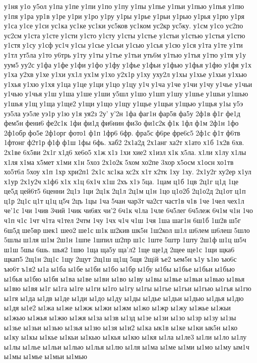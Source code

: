 {{у1ня
у1о
у5ол
у1па
у1пе
у1пи
у1по
у1пу
у1пы
у1пье
у1пьи
у1пью
у1пья
у1пю
у1пя
у1ра
ур1в
у1ре
у1ри
у1ро
у1ру
у1ры
у1рье
у1рьи
у1рью
у1рья
у1рю
у1ря
у1са
у1се
у1си
ус1ка
ус1ке
ус1ки
ус5ков
ус1ком
ус2кр
ус5ку.
у1см
у1со
ус2по
ус2см
у1ста
у1сте
у1сти
у1сто
у1сту
у1сты
у1стье
у1стьи
у1стью
у1стья
у1стю
у1стя
у1су
у1сф
ус1ч
у1сы
у1сье
у1сьи
у1сью
у1сья
у1сю
у1ся
у1та
у1те
у1ти
у1тл
ут5ла
у1то
у6трь
у1ту
у1ты
у1тье
у1тьи
уть6м
у1тью
у1тья
у1тю
у1тя
у1у
уум5
уу2с
у1фа
у1фе
у1фи
у1фо
у1фу
у1фье
у1фьи
у1фью
у1фья
у1фю
у1фя
у1х
у1ха
у2хв
у1хе
у1хи
ух1л
ух1м
у1хо
у2х1р
у1ху
уху2л
у1хы
у1хье
у1хьи
у1хью
у1хья
у1хю
у1хя
у1ца
у1це
у1ци
у1цо
у1цу
у1ч
у1ча
у1че
у1чи
у1чу
у1чье
у1чьи
у1чью
у1чья
у1ш
у1ша
у1ше
у1ши
у5шл
у1шо
у1шп
у1шу
у1шье
у1шьи
у1шью
у1шья
у1щ
у1ща
у1ще2
у1щи
у1що
у1щу
у1щье
у1щьи
у1щью
у1щья
у1ы
у5э
уэ5ла
уэ5ле
уэ1р
у1ю
у1я
уя2з
2у'
у'2н
1фа
фаг1н
фар5в
фа5у
2ф1в
ф1г
фе1д
фем5н
фени6
фе2с1к
1фи
фи1д
фи6нин
фи3о
фи1с2к
ф1к
1фл
ф1м
2ф1н
1фо
2ф1обр
фо5е
2ф1орг
фото1
ф1п
1фр6
6фр.
фра5с
ф6ре
фре6с5
2ф1с
ф1т
ф6тв
1фтонг
ф2т1р
ф1ф
ф1ш
1фы
6фь.
хаб2
2х1а2д
2х1анг
ха2т
х1ато
х1б
1х2в
6хв.
2х1ве
6х5ви
2х1г
х1д6
хе6о5
х1ж
х1з
1хи
хие2
х1изл
х1к
х5ла.
х1ли
х1лу
х1лы
х1ля
х1ма
х5мет
х1ми
х1н
5хоз
2х1о2к
5хом
хо2пе
3хор
х5осм
х1осн
хо1тв
хо5т6л
5хоу
х1п
1хр
хри2п1
2х1с
хс1ка
хс2х
х1т
х2тк
1ху
1ху.
2х1у2г
ху2ер
х1ул
х1ур
2х1у2ч
х1ф6
х1х
х1ц
6х1ч
х1ш
2хъ
х1э
5ца.
1цам
ц1б
1цв
2ц1г
ц1д
1це
це5д
цей6т5
6ценни
2ц1з
1ци
2ц1к
2ц1л
2ц1м
ц1н
1цо
ц1о2б
2ц1о2д
2ц1от
ц1п
ц1р
2ц1с
ц1т
ц1ц
ц5ч
2цъ
1цы
1ча
5чан
чар3т
ча2ст
част1в
ч1в
1че
1чел
чех1л
че'1с
1чи
1чив
3чий
1чик
чи6ях
чи'2
6ч1к
ч1ла
1чле
6ч5лег
6ч5леж
6ч1м
ч1н
1чо
ч1п
ч1с
1чт
ч1та
ч1тел
2чтм
1чу
1чх
ч1ч
ч1ш
1чя
1ша
шаг1н
6ш1б
1ш2в
ш5г
6ш5д
ше5вр
шек1
шео2
ше1с
ш1к
ш2кив
шк5н
1ш2кол
ш1л
ш6лем
ш6леш
5шло
5шлы
ш1ля
ш1м
2ш1н
1шпе
1шпил
ш2пр
ш1с
1ште
5штр
1шту
2ш1ф
ш1ц
ш5ч
ш1ш
5шы
6шь.
шья2
1шю
1ща
ща5у
ща'л2
1ще
ще1д
2щее
ще1с
1щи
щка6
щкап5
2щ1н
2щ1с
1щу
2щут
2щ1ш
щ1щ
5щя
2щiй
ъе2
ъем5н
ъ1у
ъ1ю
ъю6с
ъю6т
ъ1я2
ы1а
ы1ба
ы1бе
ы1би
ы1бо
ы1бр
ы1бу
ы1бы
ы1бье
ы1бьи
ы1бью
ы1бья
ы1бю
ы1бя
ы1ва
ы1ве
ы1ви
ы1во
ы1ву
ы1вы
ы1вье
ы1вьи
ы1вью
ы1вья
ы1вю
ы1вя
ы1г
ы1га
ы1ге
ы1ги
ы1го
ы1гу
ы1гы
ы1гье
ы1гьи
ы1гью
ы1гья
ы1гю
ы1гя
ы1да
ы1дв
ы1де
ы1ди
ы1до
ы1ду
ы1ды
ы1дье
ы1дьи
ы1дью
ы1дья
ы1дю
ы1дя
ы1е2
ы1жа
ы1же
ы1жж
ы1жи
ы1жм
ы1жо
ы1жр
ы1жу
ы1жье
ы1жьи
ы1жью
ы1жья
ы1жю
ы1жя
ы1за
ы1зв
ы1зд
ы1зе
ы1зи
ы1зо
ы1зр
ы1зу
ы1зы
ы1зье
ы1зьи
ы1зью
ы1зья
ы1зю
ы1зя
ы1и2
ы1ка
ык1в
ы1ке
ы1ки
ык5н
ы1ко
ы1ку
ы1кы
ы1кье
ы1кьи
ы1кью
ы1кья
ы1кю
ы1кя
ы1ла
ы1ле3
ы1ли
ы1ло
ы1лу
ы1лы
ы1лье
ы1льи
ы1лью
ы1лья
ы1лю
ы1ля
ы1ма
ы1ме
ы1ми
ы1мо
ы1му
ым1ч
ы1мы
ы1мье
ы1мьи
ы1мью
}}
